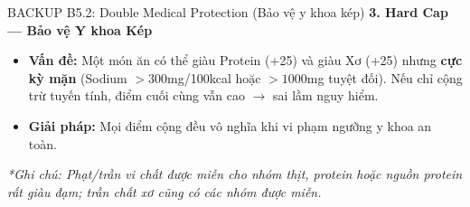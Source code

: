 \documentclass[10pt, aspectratio=169]{beamer}
\begin{document}
\begin{frame}[label=b5_2]{BACKUP B5.2: Double Medical Protection (Bảo vệ y khoa kép)}
\hypertarget{b5_2_target}{}
    \textbf{3. Hard Cap — Bảo vệ Y khoa Kép}
    \vspace{0.1cm}
    
    \begin{itemize}
        \small
        \item \textbf{Vấn đề:} Một món ăn có thể giàu Protein (+25) và giàu Xơ (+25) nhưng \textbf{cực kỳ mặn} (Sodium $> 300$mg/100kcal hoặc $> 1000$mg tuyệt đối). Nếu chỉ cộng trừ tuyến tính, điểm cuối cùng vẫn cao $\rightarrow$ sai lầm nguy hiểm.
        \item \textbf{Giải pháp:} Mọi điểm cộng đều vô nghĩa khi vi phạm ngưỡng y khoa an toàn.
    \end{itemize}
    
    
    \vspace{0.2cm}
    \small \textit{*Ghi chú: Phạt/trần vi chất được miễn cho nhóm thịt, protein hoặc nguồn protein rất giàu đạm; trần chất xơ cũng có các nhóm được miễn.}
\end{frame}
\end{document}
